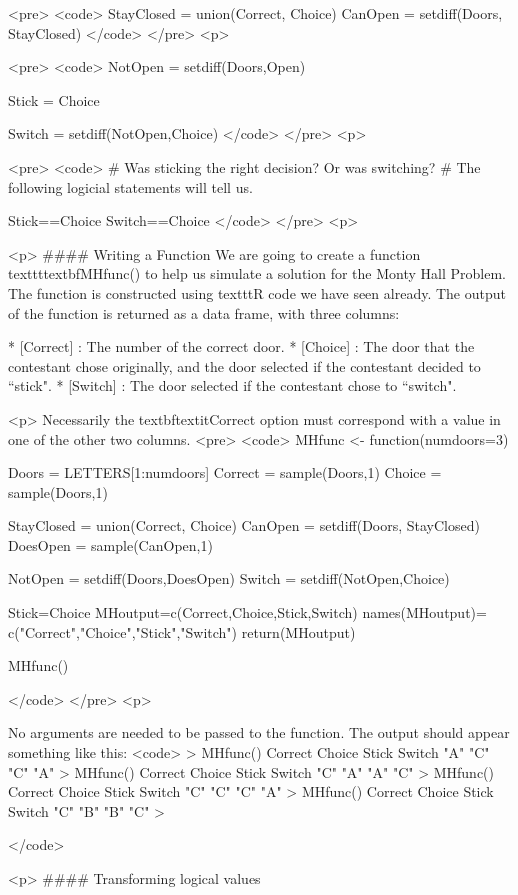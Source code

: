 <pre>
<code>
StayClosed = union(Correct, Choice)
CanOpen = setdiff(Doors, StayClosed)
</code> 
</pre>
<p>


<pre>
<code>
NotOpen = setdiff(Doors,Open)

Stick = Choice        
   
Switch = setdiff(NotOpen,Choice)
</code> 
</pre>
<p>


<pre>
	<code>
# Was sticking the right decision? Or was switching?
# The following logicial statements  will tell us.

Stick==Choice
Switch==Choice
</code> 
</pre>
<p>


<p>
#### {Writing a Function}
We are going to create a function texttt{textbf{MHfunc()}} to help us simulate a solution for the Monty Hall Problem. The function is constructed using texttt{R} code we have seen already. The output of the function is returned as a data frame, with three columns:
 
        * [Correct] : The number of the correct door.
        * [Choice] :  The door that the contestant chose originally, and the door selected if the contestant decided to ``stick".
        * [Switch] : The door selected if the contestant chose to ``switch".


<p>
Necessarily the textbf{textit{Correct}} option must correspond with a value in one of the other two columns.
<pre>
<code>
MHfunc <- function(numdoors=3){
 Doors = LETTERS[1:numdoors]
 Correct = sample(Doors,1)
 Choice = sample(Doors,1)
 
 StayClosed = union(Correct, Choice)
 CanOpen = setdiff(Doors, StayClosed)
 DoesOpen = sample(CanOpen,1)
 
 NotOpen = setdiff(Doors,DoesOpen)
 Switch = setdiff(NotOpen,Choice)

 Stick=Choice 
 MHoutput=c(Correct,Choice,Stick,Switch)
 names(MHoutput)= c("Correct","Choice","Stick","Switch")
 return(MHoutput)
}
MHfunc()

</code> 
</pre>
<p>

No arguments are needed to be passed to the function. The output should appear something like this:
<code>
> MHfunc()
Correct  Choice   Stick  Switch 
"A"     "C"     "C"     "A" 
> MHfunc()
Correct  Choice   Stick  Switch 
"C"     "A"     "A"     "C" 
> MHfunc()
Correct  Choice   Stick  Switch 
"C"     "C"     "C"     "A" 
> MHfunc()
Correct  Choice   Stick  Switch 
"C"     "B"     "B"     "C" 
> 

</code>

<p>
#### {Transforming logical values}

